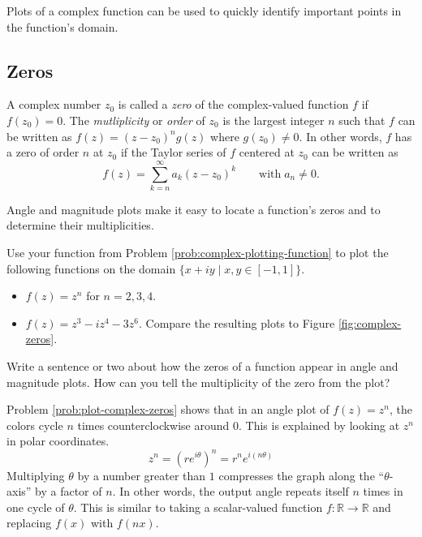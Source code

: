 Plots of a complex function can be used to quickly identify important points in the function's domain.

\subsection*{Zeros} %

A complex number $z_0$ is called a \emph{zero} of the complex-valued function $f$ if $f(z_0) = 0$.
The \emph{mutliplicity} or \emph{order} of $z_0$ is the largest integer $n$ such that $f$ can be written as $f(z) = (z - z_0)^n g(z)$ where $g(z_0) \ne 0$.
In other words, $f$ has a zero of order $n$ at $z_0$ if the Taylor series of $f$ centered at $z_0$ can be written as
\[
f(z) = \sum_{k=n}^{\infty} a_k(z-z_0)^k \qquad \text{with}\; a_n \neq 0.
\]

Angle and magnitude plots make it easy to locate a function's zeros and to determine their multiplicities.

\begin{problem} %
Use your function from Problem \ref{prob:complex-plotting-function} to plot the following functions on the domain $\{x+iy \mid x,y \in [-1,1]\}$.
\begin{itemize}
\item $f(z) = z^n$ for $n=2,3,4$.
\item $f(z) = z^3 - iz^4 - 3z^6$.
Compare the resulting plots to Figure \ref{fig:complex-zeros}.
\end{itemize}
Write a sentence or two about how the zeros of a function appear in angle and magnitude plots.
How can you tell the multiplicity of the zero from the plot?
\label{prob:plot-complex-zeros}
\end{problem}


Problem \ref{prob:plot-complex-zeros} shows that in an angle plot of $f(z) = z^n$, the colors cycle $n$ times counterclockwise around 0.
This is explained by looking at $z^n$ in polar coordinates.
\[
z^n = (re^{i \theta})^n = r^n e^{i(n\theta)}
\]
Multiplying $\theta$ by a number greater than $1$ compresses the graph along the ``$\theta$-axis'' by a factor of $n$.
In other words, the output angle repeats itself $n$ times in one cycle of $\theta$.
This is similar to taking a scalar-valued function $f:\mathbb{R}\rightarrow\mathbb{R}$ and replacing $f(x)$ with $f(nx)$.

